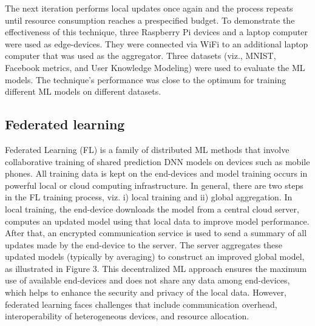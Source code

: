 \documentclass[letterpaper, 10 pt, conference]{ieeeconf}
\begin{document}
The next iteration performs local updates once again and the process repeats until resource consumption reaches a prespecified budget.
To demonstrate the effectiveness of this technique, three Raspberry Pi devices and a laptop computer were used as edge-devices. They were connected via WiFi to an additional laptop computer that was used as the aggregator. Three datasets (viz., MNIST, Facebook metrics, and User Knowledge Modeling) were used to evaluate the ML models. The technique's performance was close to the optimum for training different ML models on different datasets.
\subsection{Federated learning}
Federated Learning (FL) is a family of distributed ML methods that involve collaborative training of shared prediction DNN models on devices such as mobile phones\cite{McMahan_Moore_Ramage_Hampson_Arcas_2017}. All training data is kept on the end-devices and model training occurs in powerful local or cloud computing infrastructure. In general, there are two steps in the FL training process, viz. i) local training and ii) global aggregation. In local training, the end-device downloads the model from a central cloud server, computes an updated model using that local data to improve model performance. After that, an encrypted communication service is used to send a summary of all updates made by the end-device to the server. The server aggregates these updated models (typically by averaging) to construct an improved global model, as illustrated in Figure 3. This decentralized ML approach ensures the maximum use of available end-devices and does not share any data among end-devices, which helps to enhance the security and privacy of the local data. However, federated learning faces challenges that include communication overhead, interoperability of heterogeneous devices, and resource allocation\cite{Li_Sahu_Talwalkar_Smith_2020, Lim_Luong_Hoang_Jiao_Liang_Yang_Niyato_Miao_2020}.
\end{document}

